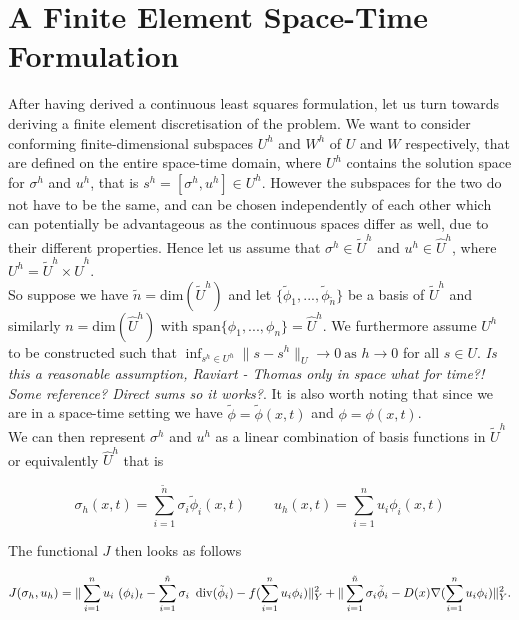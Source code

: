 \documentclass[../draft_1.tex]{subfiles}
\begin{document}
\section{A Finite Element Space-Time Formulation}

After having derived a continuous least squares formulation, let us turn towards deriving a finite element discretisation of the problem. We want to consider conforming finite-dimensional subspaces $U^h$ and $W^h$ of $U$ and $W$ respectively, that are defined on the entire space-time domain, where $U^h$ contains the solution space for $\sigma^h$ and $u^h$, that is $s^h = [\sigma^h, u^h] \in U^h$. However the subspaces for the two do not have to be the same, and can be chosen independently of each other which can potentially be advantageous as the continuous spaces differ as well, due to their different properties. Hence let us assume that $\sigma^h \in \tilde{U}^h$ and $u^h \in \hat{U}^h$, where $ U^h = \tilde{U}^h \times \hat{U}^h$. 
\smallskip
\\ 
So suppose we have $\tilde{n} = \text{dim}(\tilde{U}^h)$ and let $ \{\tilde{\phi}_1, ..., \tilde{\phi}_{\tilde{n}}\} $ be a basis of $\tilde{U}^h$ and similarly $n = \text{dim}(\hat{U}^h)$ with $\text{span} \{\phi_1, ..., \phi_n\}  = \hat{U}^h$. We furthermore assume $U^h$ to be constructed such that $\inf_{s^h \in U^h} \| s - s^h\|_U \rightarrow 0 \ \text{as } h \rightarrow 0$ for all $s \in U$. \textit{Is this a reasonable assumption, Raviart - Thomas only in space what for time?! Some reference? Direct sums so it works?}. It is also worth noting that since we are in a space-time setting we have $\tilde{\phi} = \tilde{\phi}(x,t)$ and  $\phi = \phi(x,t)$.
\smallskip
\\ 
We can then represent $\sigma^h$ and $u^h$ as a linear combination of basis functions in $\tilde{U}^h$ or equivalently $\hat{U}^h$ that is
\begin{ceqn}
	\begin{equation}
 	\sigma_h(x,t) = \sum_{i = 1}^{\tilde{n}} \sigma_i \tilde{\phi}_i(x,t) \qquad 
	u_h(x,t) = \sum_{i = 1}^{n} u_i \phi_i(x,t) 
	\end{equation}
\end{ceqn}
The functional $J$ then looks as follows 
\begin{ceqn}
	\begin{equation}
J(\sigma_h, u_h) =\| \sum_{i=1}^{n} u_i \ (\phi_i)_t - \sum_{i=1}^{\tilde{n}} \sigma_i \ \mathop{}\!\mathrm{div}(\tilde{\phi}_i) - f(\sum_{i=1}^{n} u_i \phi_i) \|_Y^2 + \| \sum_{i=1}^{\tilde{n}} \sigma_i \tilde{\phi}_i - D(x) \nabla (\sum_{i=1}^{n} u_i \phi_i) \| _Y^2.
	\end{equation}
\end{ceqn}
\end{document}

